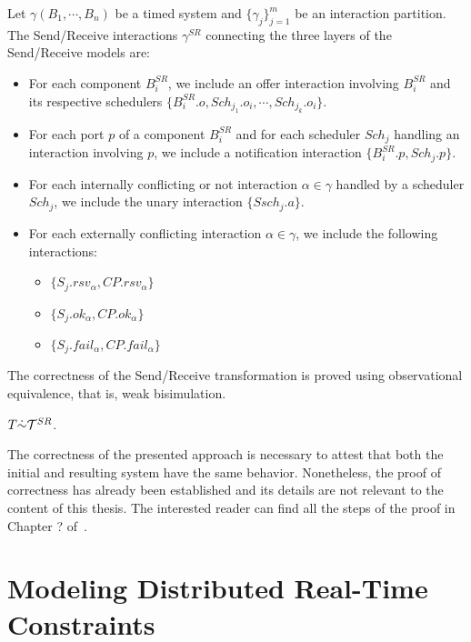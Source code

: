 \begin{definition}
  Let $\gamma(B_1,\cdots,B_n)$ be a timed system and $\{\gamma_j\}^m_{j=1}$ be an interaction
  partition. The Send/Receive interactions $\gamma^{SR}$ connecting the three layers of the
  Send/Receive models are:
  \begin{itemize}
    \item For each component $B_i^{SR}$, we include an offer interaction involving $B_i^{SR}$
      and its respective schedulers $\{B_i^{SR}.o,Sch_{j_1}.o_i,\cdots,Sch_{j_k}.o_i\}$.
    \item For each port $p$ of a component $B_i^{SR}$ and for each scheduler $Sch_j$ handling
      an interaction involving $p$, we include a notification interaction 
      $\{B_i^{SR}.p,Sch_{j}.p\}$.
    \item For each internally conflicting or not interaction $\alpha\in\gamma$ handled by 
      a scheduler $Sch_j$, we include the unary interaction $\{Ssch_j.a\}$.
    \item For each externally conflicting interaction $\alpha\in\gamma$, we include the following
      interactions:
      \begin{itemize}
        \item $\{S_j.rsv_{\alpha},CP.rsv_{\alpha}\}$
        \item $\{S_j.ok_{\alpha},CP.ok_{\alpha}\}$
        \item $\{S_j.fail_{\alpha},CP.fail_{\alpha}\}$
      \end{itemize}
  \end{itemize}
\end{definition}

The correctness of the Send/Receive transformation is proved using observational equivalence, 
that is, weak bisimulation. 
\begin{theorem}
  $T\dot{\sim}\mathcal{T}^{SR}$.
\end{theorem}
The correctness of the presented approach is necessary to attest that both the initial
and resulting system have the same behavior. Nonetheless, the proof of correctness has
already been established and its details are not relevant to the content of this thesis.
The interested reader can find all the steps of the proof in Chapter ? of~\cite{}.
\section{Modeling Distributed Real-Time Constraints}

